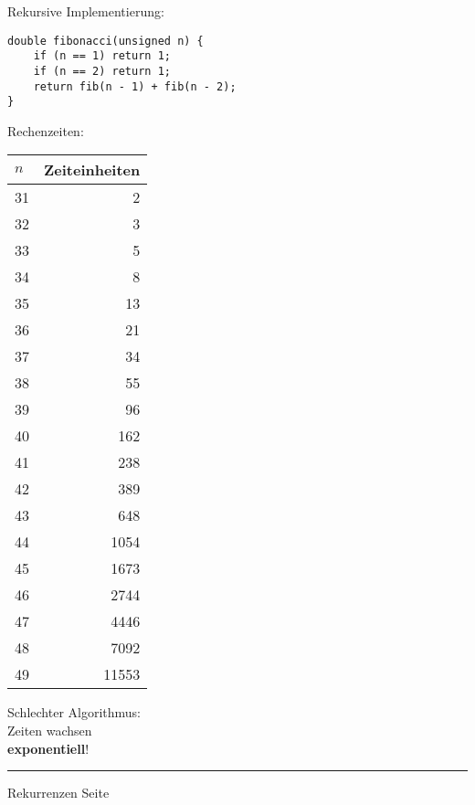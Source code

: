 \begin{slide}{}
\normalsize

\begin{center}
Rekursive Implementierung:
\end{center}
\vspace*{0.5cm}

\footnotesize

\begin{verbatim}
double fibonacci(unsigned n) {
    if (n == 1) return 1;
    if (n == 2) return 1;
    return fib(n - 1) + fib(n - 2);
}
\end{verbatim}
Rechenzeiten:

\begin{tabular}{|l|r|}
\hline
 $n$  &  Zeiteinheiten \\
\hline
\hline
31 & 2  \\
32 & 3  \\
33 & 5  \\
34 & 8  \\
35 & 13  \\
36 & 21  \\
37 & 34  \\
38 & 55  \\
39 & 96  \\
40 & 162  \\
41 & 238  \\
42 & 389  \\
43 & 648  \\
44 & 1054 \\
45 & 1673  \\
46 & 2744  \\
47 & 4446  \\
48 & 7092  \\
49 & 11553  \\
\hline 
\end{tabular}
\hspace*{1cm}
\begin{minipage}{8cm}
Schlechter Algorithmus: \\[0.3cm]
Zeiten wachsen \\[0.3cm]
 \textbf{exponentiell}!
\end{minipage}

\vspace*{\fill}
\tiny \addtocounter{mypage}{1}
\rule{17cm}{1mm}
Rekurrenzen  \hspace*{\fill} Seite 
\end{slide}


